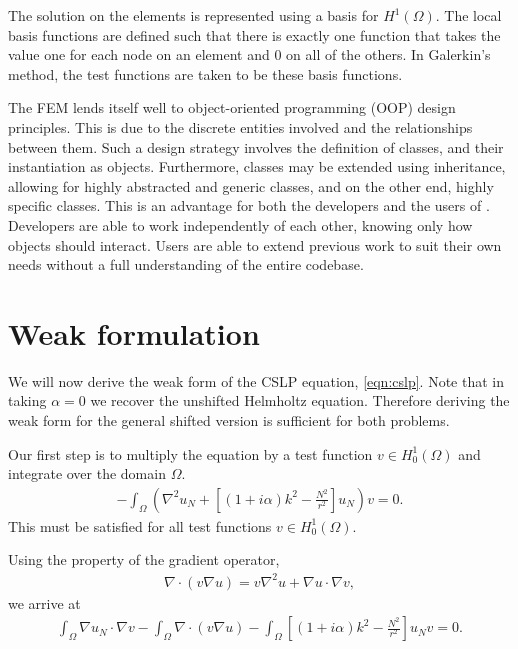 The solution on the elements is represented using a basis for $H^1(\Omega)$.
The local basis functions are defined such that there is exactly one function that takes the value one for each node on an element and 0 on all of the others.
In Galerkin's method, the test functions are taken to be these basis functions. 

The FEM lends itself well to object-oriented programming (OOP) design principles.
This is due to the discrete entities involved and the relationships between them.
Such a design strategy involves the definition of classes, and their instantiation as objects.
Furthermore, classes may be extended using inheritance, allowing for highly abstracted and generic classes, and on the other end, highly specific classes.
This is an advantage for both the developers and the users of \oomph.
Developers are able to work independently of each other, knowing only how objects should interact.
Users are able to extend previous work to suit their own needs without a full understanding of the entire codebase.







\section{Weak formulation}

We will now derive the weak form of the CSLP equation, \eqref{eqn:cslp}.
Note that in taking $\alpha=0$ we recover the unshifted Helmholtz equation.
Therefore deriving the weak form for the general shifted version is sufficient for both problems.

Our first step is to multiply the equation by a test function $v\in H^1_0(\Omega)$ and integrate over the domain $\Omega$.
\begin{align}
	-\int_\Omega \left(\nabla^2 u_N + \left[ (1+i\alpha)k^2-\frac{N^2}{r^2}\right]u_N \right) v = 0.
\end{align}
This must be satisfied for all test functions $v \in H^1_0(\Omega)$.

Using the property of the gradient operator,
\begin{align}
	\nabla \cdot ( v \nabla u) = v \nabla^2 u + \nabla u \cdot \nabla v,
\end{align}
we arrive at
\begin{align}
	\int_\Omega \nabla u_N \cdot \nabla v 
  - \int_\Omega \nabla \cdot (v \nabla u ) 
  - \int_\Omega \left[(1+i\alpha)k^2 - \frac{N^2}{r^2}\right] u_N v = 0.
\end{align}

